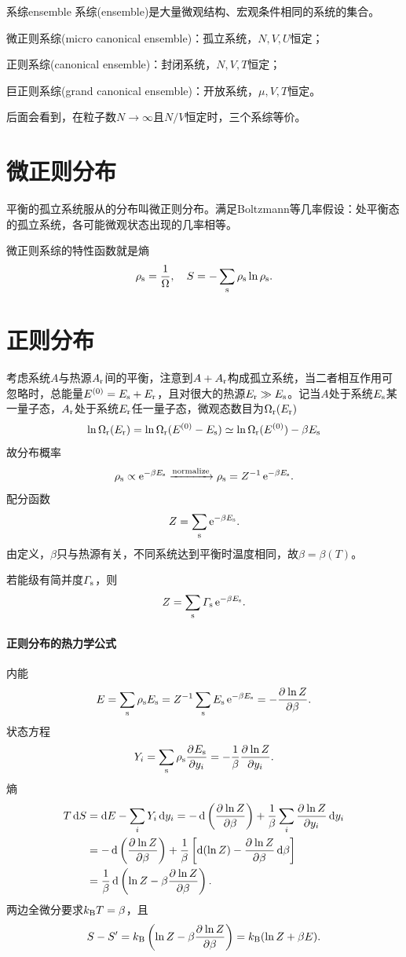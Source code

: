 \begin{definition}{系综}{ensemble}
	系综(ensemble)是大量微观结构、宏观条件相同的系统的集合。
	\begin{compactitem}
		\item 微正则系综(micro canonical ensemble)：孤立系统，$N,V,U$恒定；
		\item 正则系综(canonical ensemble)：封闭系统，$N,V,T$恒定；
		\item 巨正则系综(grand canonical ensemble)：开放系统，$\mu,V,T$恒定。
	\end{compactitem}
\end{definition}
后面会看到，在粒子数$N\to\infty$且$N/V$恒定时，三个系综等价。
\section{微正则分布}
平衡的孤立系统服从的分布叫微正则分布。满足Boltzmann等几率假设：处平衡态的孤立系统，各可能微观状态出现的几率相等。

微正则系综的特性函数就是熵
\[
	\rho_\mathrm s=\frac1\Omega,\quad S=-\sum_\mathrm s\rho_\mathrm s\ln\rho_\mathrm s.
\]
\section{正则分布}
考虑系统$A$与热源$A_\mathrm r$间的平衡，注意到$A+A_\mathrm r$构成孤立系统，当二者相互作用可忽略时，总能量$E^{(0)}=E_\mathrm s+E_\mathrm r$，且对很大的热源$E_\mathrm r\gg E_\mathrm s$。记当$A$处于系统$E_\mathrm s$某一量子态，$A_\mathrm r$处于系统$E_\mathrm r$任一量子态，微观态数目为$\Omega_\mathrm r(E_\mathrm r)$
\[
	\ln\Omega_\mathrm r(E_\mathrm r)=\ln\Omega_\mathrm r(E^{(0)}-E_\mathrm s)\simeq\ln\Omega_\mathrm r(E^{(0)})-\beta E_\mathrm s
\]
故分布概率
\[
	\rho_\mathrm s\propto\mathop{}\!\mathrm{e}^{-\beta E_\mathrm s}\xrightarrow{\text{normalize}}\rho_\mathrm s=Z^{-1}\mathop{}\!\mathrm{e}^{-\beta E_\mathrm s}.
\]
配分函数
\[
	Z=\sum_\mathrm s\mathop{}\!\mathrm{e}^{-\beta E_\mathrm s}.
\]
由定义，$\beta$只与热源有关，不同系统达到平衡时温度相同，故$\beta=\beta(T)$。

若能级有简并度$\varGamma_\mathrm s$，则 
\begin{align}
	Z=\sum_\mathrm s\varGamma_\mathrm s\mathop{}\!\mathrm{e}^{-\beta E_\mathrm s}.
\end{align}
\paragraph{正则分布的热力学公式}内能
\begin{align}
	E=\sum_\mathrm s\rho_\mathrm s E_\mathrm s=Z^{-1}\sum_\mathrm s E_\mathrm s\mathop{}\!\mathrm{e}^{-\beta E_\mathrm s}=-\frac{\partial^{{}}\ln Z}{\partial{\beta}^{{}}}.
\end{align}
状态方程
\begin{align}
	Y_i=\sum_\mathrm s\rho_\mathrm s\frac{\partial^{{}}E_\mathrm s}{\partial{y_i}^{{}}}=-\frac1\beta\frac{\partial^{{}}\ln Z}{\partial{y_i}^{{}}}.
\end{align}
熵
\begin{align*}
	T\d S&=\d E-\sum_i Y_i\d y_i=-\d\kh{\pv{\ln Z}\beta}+\frac1\beta\sum_i\pv{\ln Z}{y_i}\d y_i\\
	&=-\d\kh{\pv{\ln Z}\beta}+\frac1\beta\fkh{\d(\ln Z)-\pv{\ln Z}\beta\d\beta}\\
	&=\frac1\beta\d\kh{\ln Z-\beta\pv{\ln Z}\beta}.
\end{align*}
两边全微分要求$k_{\mathrm B} T=\beta$，且 
\begin{align}
	S-S'=k_{\mathrm B}\left(\ln Z-\beta\frac{\partial^{{}}\ln Z}{\partial{\beta}^{{}}}\right)=k_{\mathrm B}(\ln Z+\beta E).
\end{align}

